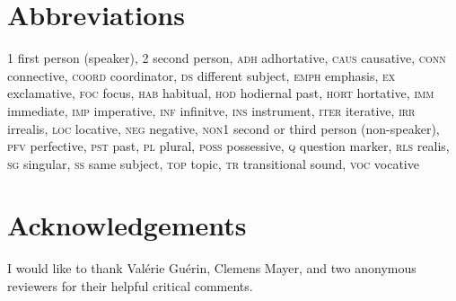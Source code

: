 \documentclass[output=paper]{LSP/langsci}
\begin{document}
			
			
\section*{Abbreviations}


\textsc{1}		first person (speaker),
\textsc{2}		second person,
\textsc{adh}		adhortative,
\textsc{caus}		causative,
\textsc{conn}							connective,
\textsc{coord}							coordinator,
\textsc{ds}									different subject,
\textsc{emph}								emphasis,
\textsc{ex}									exclamative,
\textsc{foc}									focus,
\textsc{hab}								habitual,
\textsc{hod}								hodiernal past,
\textsc{hort}						   		hortative,
\textsc{imm}								immediate,
\textsc{imp}									imperative,
\textsc{inf}									infinitve,
\textsc{ins}									instrument,
\textsc{iter}									iterative,
\textsc{irr}									irrealis,
\textsc{loc}								locative,
\textsc{neg}								negative,
\textsc{non1}								second or third person (non-speaker),
\textsc{pfv}								perfective,
\textsc{pst}									past,
\textsc{pl}									plural,
\textsc{poss}									possessive,
\textsc{q}											question marker,
\textsc{rls}								realis,
\textsc{sg}									singular,
\textsc{ss}									same subject,
\textsc{top}								topic,
\textsc{tr}									transitional sound,
\textsc{voc}									vocative


\section*{Acknowledgements}
I would like to thank Valérie Guérin, Clemens Mayer, and two anonymous reviewers for their helpful critical comments.


\sloppy

\printbibliography[heading=subbibliography,notkeyword=this]
\end{document}
